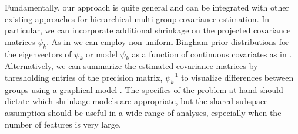 \documentclass{article}
\begin{document}
Fundamentally, our approach is quite general and can be integrated
with other existing approaches for hierarchical multi-group covariance
estimation.  In particular, we can incorporate additional shrinkage on
the projected covariance matrices $\psi_k$.  As in \citet{Hoff2009} we
can employ non-uniform Bingham prior distributions for the
eigenvectors of $\psi_k$ or model $\psi_k$ as a function of continuous
covariates as in \citet{Yin2010, Hoff2011}.  Alternatively, we can
summarize the estimated covariance matrices by thresholding entries of
the precision matrix, $\psi_k^{-1}$ to visualize differences between
groups using a graphical model \citet{Meinshausen2006}.  The specifics
of the problem at hand should dictate which shrinkage models are
appropriate, but the shared subspace assumption should be useful in a
wide range of analyses, especially when the number of features is very
large.




\end{document}
